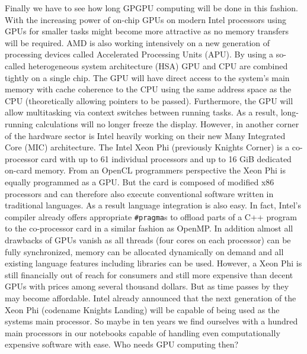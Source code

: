Finally we have to see how long GPGPU computing will be done in this fashion. With the increasing power of on-chip GPUs on modern Intel processors using GPUs for smaller tasks might become more attractive as no memory transfers will be required. AMD is also working intensively on a new generation of processing devices called Accelerated Processing Units (APU). By using a so-called heterogeneous system architecture (HSA) GPU and CPU are combined tightly on a single chip. The GPU will have direct access to the system's main memory with cache coherence to the CPU using the same address space as the CPU (theoretically allowing pointers to be passed). Furthermore, the GPU will allow multitasking via context switches between running tasks. As a result, long-running calculations will no longer freeze the display.
However, in another corner of the hardware sector is Intel heavily working on their new Many Integrated Core (MIC) architecture. The Intel Xeon Phi (previously Knights Corner) is a co-processor card with up to 61 individual processors and up to 16 GiB dedicated on-card memory. From an OpenCL programmers perspective the Xeon Phi is equally programmed as a GPU. But the card is composed of modified x86 processors and can therefore also execute conventional software written in traditional languages. As a result language integration is also easy. In fact, Intel's compiler already offers appropriate \lstinline!#pragma!s to offload parts of a C++ program to the co-processor card in a similar fashion as OpenMP. In addition almost all drawbacks of GPUs vanish as all threads (four cores on each processor) can be fully synchronized, memory can be allocated dynamically on demand and all existing language features including libraries can be used. However, a Xeon Phi is still financially out of reach for consumers and still more expensive than decent GPUs with prices among several thousand dollars. But as time passes by they may become affordable. Intel already announced that the next generation of the Xeon Phi (codename Knights Landing) will be capable of being used as the systems main processor. So maybe in ten years we find ourselves with a hundred main processors in our notebooks capable of handling even computationally expensive software with ease. Who needs GPU computing then?
